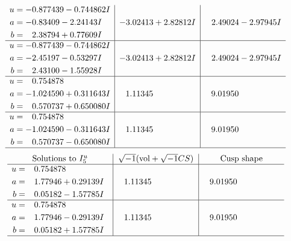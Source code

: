 \documentclass[1p]{elsarticle_modified}
\theoremstyle{definition}
\newcommand{\I}{\sqrt{-1}}
\begin{document}
$$\begin{array}{c|c|c}
\begin{aligned}
u &= -0.877439 - 0.744862 I \\
a &= -0.83409 - 2.24143 I \\
b &= \phantom{-}2.38794 + 0.77609 I\end{aligned}
 & -3.02413 + 2.82812 I & \phantom{-}2.49024 - 2.97945 I \\ \hline\begin{aligned}
u &= -0.877439 - 0.744862 I \\
a &= -2.45197 - 0.53297 I \\
b &= \phantom{-}2.43100 - 1.55928 I\end{aligned}
 & -3.02413 + 2.82812 I & \phantom{-}2.49024 - 2.97945 I \\ \hline\begin{aligned}
u &= \phantom{-}0.754878\phantom{ +0.000000I} \\
a &= -1.024590 + 0.311643 I \\
b &= \phantom{-}0.570737 + 0.650080 I\end{aligned}
 & \phantom{-}1.11345\phantom{ +0.000000I} & \phantom{-}9.01950\phantom{ +0.000000I} \\ \hline\begin{aligned}
u &= \phantom{-}0.754878\phantom{ +0.000000I} \\
a &= -1.024590 - 0.311643 I \\
b &= \phantom{-}0.570737 - 0.650080 I\end{aligned}
 & \phantom{-}1.11345\phantom{ +0.000000I} & \phantom{-}9.01950\phantom{ +0.000000I}\\
 \hline 
 \end{array}$$\newpage$$\begin{array}{c|c|c}  
\text{Solutions to }I^u_{5}& \I (\text{vol} + \sqrt{-1}CS) & \text{Cusp shape}\\
 \hline 
\begin{aligned}
u &= \phantom{-}0.754878\phantom{ +0.000000I} \\
a &= \phantom{-}1.77946 + 0.29139 I \\
b &= \phantom{-}0.05182 - 1.57785 I\end{aligned}
 & \phantom{-}1.11345\phantom{ +0.000000I} & \phantom{-}9.01950\phantom{ +0.000000I} \\ \hline\begin{aligned}
u &= \phantom{-}0.754878\phantom{ +0.000000I} \\
a &= \phantom{-}1.77946 - 0.29139 I \\
b &= \phantom{-}0.05182 + 1.57785 I\end{aligned}
 & \phantom{-}1.11345\phantom{ +0.000000I} & \phantom{-}9.01950\phantom{ +0.000000I}\\
 \hline 
 \end{array}$$\newpage\newpage\renewcommand{\arraystretch}{1}
\end{document}

